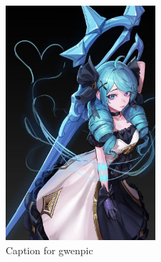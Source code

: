 \documentclass{article}  %
\begin{document}

\begin{figure}[h]
    \centering
    \includegraphics[width=0.5\textwidth]{gwenpic}
    \caption{Caption for gwenpic}
    \label{fig:gwenpic}
\end{figure}

\begin{obeylines}

\end{obeylines}
\end{document}
